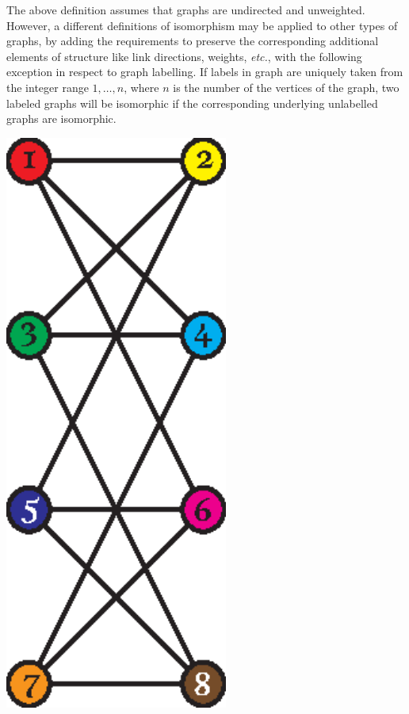       The above definition assumes that graphs are undirected and unweighted. However, a different definitions of isomorphism may be applied to other types of graphs, by adding the requirements to preserve the corresponding additional elements of structure like link directions, weights, \emph{etc.}, with the following exception in respect to graph labelling. If labels in graph are uniquely taken from the integer range $1,\ldots,n$, where $n$ is the number of the vertices of the graph, two labeled graphs will be isomorphic if the corresponding underlying unlabelled graphs are isomorphic.
      \begin{table}[H]
        \centering
        \begin{minipage}[h]{0.3\textwidth}
          \centering
          \includegraphics[width=0.55\textwidth]{chapters/02_problem_definition/isomorphism_1}
        \end{minipage}

\end{table}
